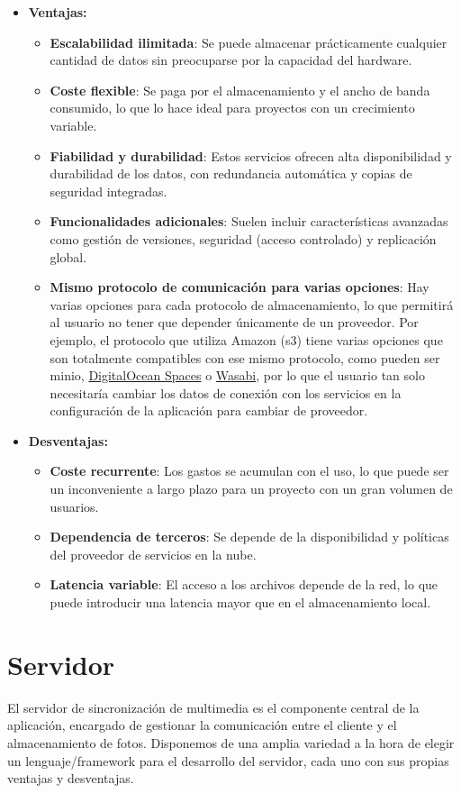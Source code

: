 \begin{itemize}
\item \textbf{Ventajas:}
    \begin{itemize}
        \item \textbf{Escalabilidad ilimitada}: Se puede almacenar prácticamente cualquier cantidad de datos sin preocuparse por la capacidad del hardware.
        \item \textbf{Coste flexible}: Se paga por el almacenamiento y el ancho de banda consumido, lo que lo hace ideal para proyectos con un crecimiento variable.
        \item \textbf{Fiabilidad y durabilidad}: Estos servicios ofrecen alta disponibilidad y durabilidad de los datos, con redundancia automática y copias de seguridad integradas.
        \item \textbf{Funcionalidades adicionales}: Suelen incluir características avanzadas como gestión de versiones, seguridad (acceso controlado) y replicación global.
        \item \textbf{Mismo protocolo de comunicación para varias opciones}: Hay varias opciones para cada protocolo de almacenamiento, lo que permitirá al usuario no tener que depender únicamente de un proveedor. Por ejemplo, el protocolo que utiliza Amazon (\gls{s3}) tiene varias opciones que son totalmente compatibles con ese mismo protocolo, como pueden ser \gls{minio}, \href{https://www.digitalocean.com/products/spaces}{DigitalOcean Spaces} o \href{https://wasabi.com/es}{Wasabi}, por lo que el usuario tan solo necesitaría cambiar los datos de conexión con los servicios en la configuración de la aplicación para cambiar de proveedor.
    \end{itemize}
\item \textbf{Desventajas:}
\begin{itemize}
\item \textbf{Coste recurrente}: Los gastos se acumulan con el uso, lo que puede ser un inconveniente a largo plazo para un proyecto con un gran volumen de usuarios.
\item \textbf{Dependencia de terceros}: Se depende de la disponibilidad y políticas del proveedor de servicios en la nube.
\item \textbf{Latencia variable}: El acceso a los archivos depende de la red, lo que puede introducir una latencia mayor que en el almacenamiento local.
\end{itemize}
\end{itemize}

\section{Servidor}
El servidor de sincronización de multimedia es el componente central de la aplicación, encargado de gestionar la comunicación entre el cliente y el almacenamiento de fotos.
Disponemos de una amplia variedad a la hora de elegir un lenguaje/\gls{framework} para el desarrollo del servidor, cada uno con sus propias ventajas y desventajas.

